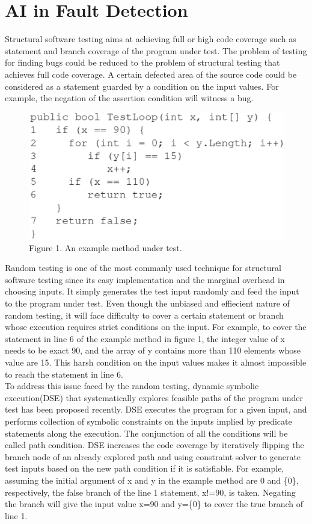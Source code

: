 \section{AI in Fault Detection}
\indent Structural software testing aims at achieving full or high code coverage such as statement and branch coverage of the program under test. The problem of testing for finding bugs could be reduced to the problem of structural testing that achieves full code coverage. A certain defected area of the source code could be considered as a statement guarded by a condition on the input values. For example, the negation of the assertion condition will witness a bug.\\
\begin{figure}[b]
\centering
\includegraphics[scale=0.5]{fig/XiFitnessEPS.eps}
\caption{Figure 1. An example method under test.}
\end{figure}
\indent Random testing is one of the most commanly used technique for structural software testing since its easy implementation and the marginal overhead in choosing inputs. It simply generates the test input randomly and feed the input to the program under test. Even though the unbiased and effiecient nature of random testing, it will face difficulty to cover a certain statement or branch whose execution requires strict conditions on the input. For example, to cover the statement in line 6 of the example method in figure 1, the integer value of x needs to be exact 90, and the array of y contains more than 110 elements whose value are 15. This harsh condition on the input values makes it almost impossible to reach the statement in line 6.\\
\indent To address this issue faced by the random testing, dynamic symbolic execution(DSE) that systematically explores feasible paths of the program under test has been proposed recently. DSE executes the program for a given input, and performs collection of symbolic constraints on the inputs implied by predicate statements along the execution. The conjunction of all the conditions will be called path condition. DSE increases the code coverage by iteratively flipping the branch node of an already explored path and using constraint solver to generate test inputs based on the new path condition if it is satisfiable. For example, assuming the initial argument of x and y in the example method are 0 and \{0\}, respectively, the false branch of the line 1 statement, x!=90, is taken. Negating the branch will give the input value x=90 and y=\{0\} to cover the true branch of line 1. \\
